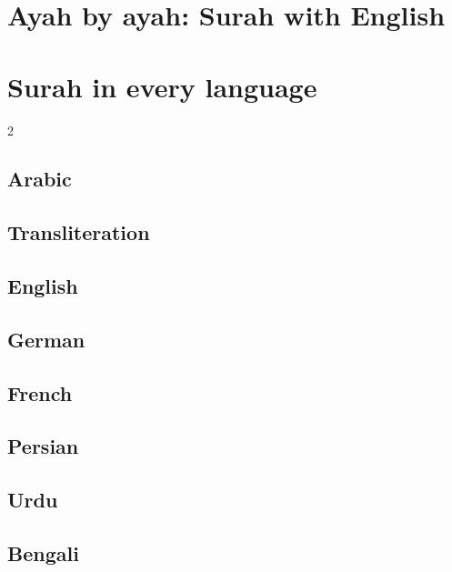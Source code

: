 \documentclass{article}
\begin{document}
\section*{Ayah by ayah: Surah \surahname[103] with English}

\section*{Surah \surahname[1] in every language}
\begin{multicols}{2}
  \subsection*{Arabic}
  \begin{arab}[utf]\quransurah[1]\end{arab}

  \subsection*{Transliteration}
  \quransurahlt[1]

  \subsection*{English}
  \quransurahen[1]

  \subsection*{German}
  \quransurahde[1]

  \subsection*{French}
  \quransurahfr[1]

  \subsection*{Persian}
  \begin{arab}[utf]\quransurahfa[1]\end{arab}

  \subsection*{Urdu}
  \begin{arab}[utf]\quransurahur[1]\end{arab}

  \subsection*{Bengali}
  {\bengalifont\quransurahbn[1]}
\end{multicols}
\end{document}
